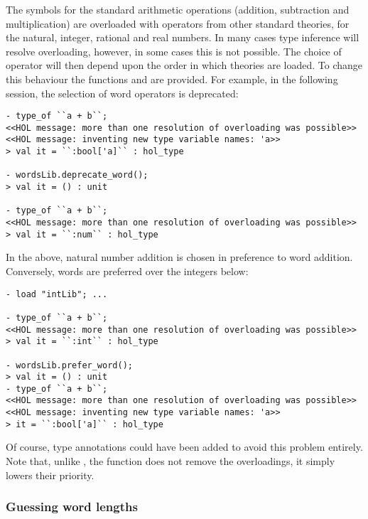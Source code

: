 The symbols for the standard arithmetic operations (addition, subtraction and multiplication) are overloaded with operators from other standard theories, \ie{} for the natural, integer, rational and real numbers.  In many cases type inference will resolve overloading, however, in some cases this is not possible.  The choice of operator will then depend upon the order in which theories are loaded.  To change this behaviour the functions  and  are provided.  For example, in the following session, the selection of word operators is deprecated:
\begin{session}
\begin{verbatim}
- type_of ``a + b``;
<<HOL message: more than one resolution of overloading was possible>>
<<HOL message: inventing new type variable names: 'a>>
> val it = ``:bool['a]`` : hol_type

- wordsLib.deprecate_word();
> val it = () : unit

- type_of ``a + b``;
<<HOL message: more than one resolution of overloading was possible>>
> val it = ``:num`` : hol_type
\end{verbatim}
\end{session}
In the above, natural number addition is chosen in preference to word addition.  Conversely, words are preferred over the integers below:
\begin{session}
\begin{verbatim}
- load "intLib"; ...

- type_of ``a + b``;
<<HOL message: more than one resolution of overloading was possible>>
> val it = ``:int`` : hol_type

- wordsLib.prefer_word();
> val it = () : unit
- type_of ``a + b``;
<<HOL message: more than one resolution of overloading was possible>>
<<HOL message: inventing new type variable names: 'a>>
> it = ``:bool['a]`` : hol_type
\end{verbatim}
\end{session}
Of course, type annotations could have been added to avoid this problem entirely.  Note that, unlike , the function  does not remove the overloadings, it simply lowers their priority.

\subsubsection{Guessing word lengths}

